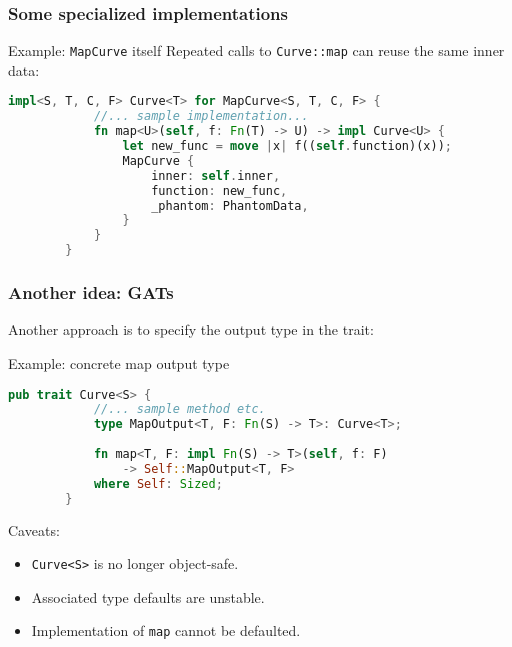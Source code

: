 \documentclass[10pt]{beamer}
\begin{document}
\begin{frame}[fragile]
    \frametitle{Some specialized implementations}
    
    \begin{exampleblock}{Example: \texttt{MapCurve} itself}
    Repeated calls to \texttt{Curve::map} can reuse the same inner data:
    \begin{lstlisting}[language=Rust, gobble=8]
        impl<S, T, C, F> Curve<T> for MapCurve<S, T, C, F> {
            //... sample implementation...
            fn map<U>(self, f: Fn(T) -> U) -> impl Curve<U> {
                let new_func = move |x| f((self.function)(x));
                MapCurve {
                    inner: self.inner,
                    function: new_func,
                    _phantom: PhantomData,
                }
            }
        }
    \end{lstlisting}
    \end{exampleblock}
\end{frame}
\begin{frame}[fragile]
    \frametitle{Another idea: GATs}
    Another approach is to specify the output type in the trait:
    \begin{exampleblock}{Example: concrete map output type}
    \begin{lstlisting}[language=Rust, gobble=8]
        pub trait Curve<S> {
            //... sample method etc.
            type MapOutput<T, F: Fn(S) -> T>: Curve<T>;
            
            fn map<T, F: impl Fn(S) -> T>(self, f: F) 
                -> Self::MapOutput<T, F>
            where Self: Sized;
        }
    \end{lstlisting}
    \end{exampleblock}\pause
    
    Caveats: 
    \begin{itemize}
        \item \texttt{Curve<S>} is no longer object-safe.\pause
        \item Associated type defaults are unstable.\pause
        \item Implementation of \texttt{map} cannot be defaulted.
    \end{itemize}
    
\end{frame}
\end{document}
